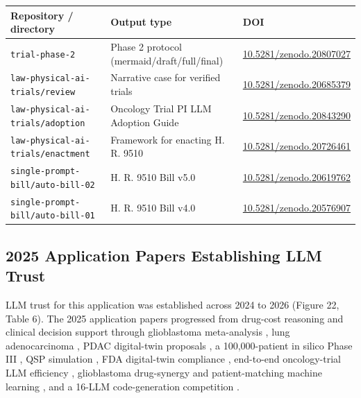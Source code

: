 \vspace{0.2em}
\noindent\begin{tabularx}{\textwidth}{L{6.4cm} L{3.6cm} Y}
\toprule
\textbf{Repository / directory} & \textbf{Output type} & \textbf{DOI} \\
\midrule
\texttt{trial-phase-2} & Phase 2 protocol (mermaid/draft/full/final) & \href{https://doi.org/10.5281/zenodo.20807027}{10.5281/zenodo.20807027} \\
\texttt{law-physical-ai-trials/review} & Narrative case for verified trials & \href{https://doi.org/10.5281/zenodo.20685379}{10.5281/zenodo.20685379} \\
\texttt{law-physical-ai-trials/adoption} & Oncology Trial PI LLM Adoption Guide & \href{https://doi.org/10.5281/zenodo.20843290}{10.5281/zenodo.20843290} \\
\texttt{law-physical-ai-trials/enactment} & Framework for enacting H. R. 9510 & \href{https://doi.org/10.5281/zenodo.20726461}{10.5281/zenodo.20726461} \\
\texttt{single-prompt-bill/auto-bill-02} & H. R. 9510 Bill v5.0 & \href{https://doi.org/10.5281/zenodo.20619762}{10.5281/zenodo.20619762} \\
\texttt{single-prompt-bill/auto-bill-01} & H. R. 9510 Bill v4.0 & \href{https://doi.org/10.5281/zenodo.20576907}{10.5281/zenodo.20576907} \\
\bottomrule
\end{tabularx}
\vspace{-0.5cm}

\subsection{2025 Application Papers Establishing LLM Trust}

LLM trust for this application was established across 2024 to 2026 (Figure 22,
Table 6). The 2025 application papers progressed from drug-cost reasoning and
clinical decision support \cite{bevacds, costmab, autollmagent} through glioblastoma
meta-analysis
\cite{gbmmeta10yr}, lung adenocarcinoma \cite{lungadeno}, PDAC digital-twin
proposals \cite{kawchak_2025_15735068}, a 100,000-patient in silico Phase III
\cite{kawchak_2025_16415815}, QSP simulation \cite{kawchak_2025_17001137}, FDA
digital-twin compliance \cite{kawchak_2025_17239510}, end-to-end oncology-trial LLM
efficiency \cite{e2eoncoeff}, glioblastoma drug-synergy and patient-matching
machine learning \cite{gbmsynergy, aipeerreview}, and a 16-LLM code-generation
competition \cite{codegen16}.

